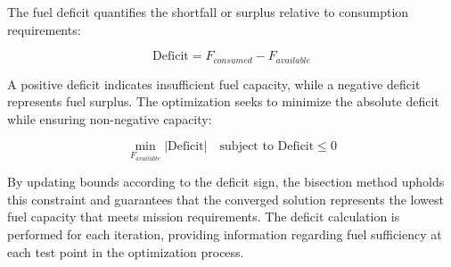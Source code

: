 The fuel deficit quantifies the shortfall or surplus relative to consumption requirements:

\begin{equation}
\text{Deficit} = F_{consumed} - F_{available}
\end{equation}

A positive deficit indicates insufficient fuel capacity, while a negative deficit represents fuel surplus. The optimization seeks to minimize the absolute deficit while ensuring non-negative capacity:

\begin{equation}
\min_{F_{available}} |\text{Deficit}| \quad \text{subject to } \text{Deficit} \leq 0
\end{equation}

By updating bounds according to the deficit sign, the bisection method upholds this constraint and guarantees that the converged solution represents the lowest fuel capacity that meets mission requirements. The deficit calculation is performed for each iteration, providing  information regarding fuel sufficiency at each test point in the optimization process.

 
